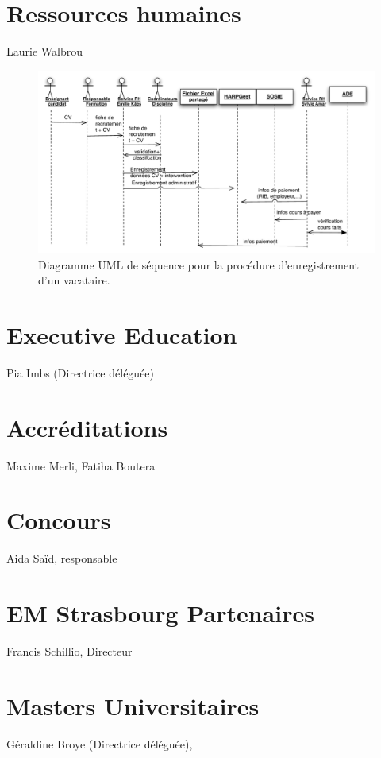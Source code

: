 \documentclass{book}
\begin{document}
\section{Ressources humaines}
Laurie Walbrou

\begin{figure}[hbt]
\begin{center}
\includegraphics[width=\linewidth]{figs/rh_seq_vacataires.pdf}
\end{center}
\caption{Diagramme UML de séquence pour la procédure d'enregistrement d'un vacataire.}
\label{fg:rh_seq_vacataires}
\end{figure}



\section{Executive Education }
Pia Imbs (Directrice déléguée)

\section{Accréditations}
Maxime Merli, Fatiha Boutera

\section{Concours }
Aida Saïd, responsable

\section{EM Strasbourg Partenaires }
Francis Schillio, Directeur 

\section{Masters Universitaires}
Géraldine Broye (Directrice déléguée),
\end{document}

